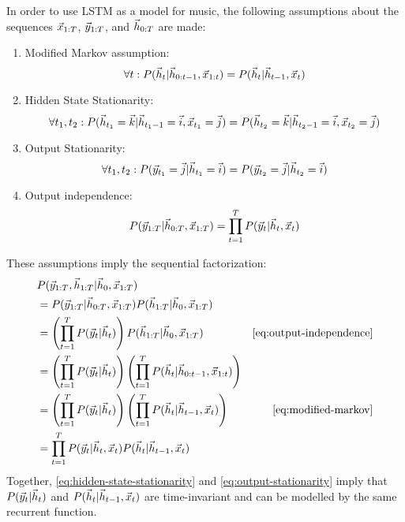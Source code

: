 In order to use LSTM as a model for music, the following assumptions
about the sequences $\vec{x}_{1:T}$, $\vec{y}_{1:T}$, and $\vec{h}_{0:T}$ are made:
\begin{enumerate}
  \item Modified Markov assumption:
    \begin{equation}
      \label{eq:modified-markov}
      \forall t: P(\vec{h}_t | \vec{h}_{0:t-1}, \vec{x}_{1:t}) = P(\vec{h}_t | \vec{h}_{t-1}, \vec{x}_t)
    \end{equation}
  \item Hidden State Stationarity:
    \begin{equation}
      \label{eq:hidden-state-stationarity}
      \forall t_1, t_2: P(\vec{h}_{t_1} = \vec{k} | \vec{h}_{t_{1}-1} = \vec{i}, \vec{x}_{t_1} = \vec{j}) = P(\vec{h}_{t_2} = \vec{k} | \vec{h}_{t_{2}-1} = \vec{i}, \vec{x}_{t_2} = \vec{j})
   \end{equation}
  \item Output Stationarity:
    \begin{equation}
      \label{eq:output-stationarity}
      \forall t_1, t_2: P(\vec{y}_{t_1} = \vec{j} | \vec{h}_{t_1} = \vec{i}) = P(\vec{y}_{t_2} = \vec{j} | \vec{h}_{t_2} = \vec{i})
   \end{equation}
  \item Output independence:
   \begin{equation}
     \label{eq:output-independence}
     P(\vec{y}_{1:T} | \vec{h}_{0:T}, \vec{x}_{1:T}) = \prod_{t=1}^T P(\vec{y}_t | \vec{h}_{t}, \vec{x}_t)
   \end{equation}
\end{enumerate}

These assumptions imply the sequential factorization:
\begin{align}
  &P(\y_{1:T}, \h_{1:T} | \h_0, \x_{1:T})  &\\
  &= P(\y_{1:T} | \h_{0:T}, \x_{1:T}) P(\h_{1:T} | \h_0, \x_{1:T})  &\\
  &= \left( \prod_{t=1}^T P(\y_t | \h_t) \right) P(\h_{1:T}| \h_0, \x_{1:T}) &\text{\cref{eq:output-independence}}\\
  &= \left( \prod_{t=1}^T P(\y_t | \h_t) \right) \left(\prod_{t=1}^T P(\h_{t}| \h_{0:t-1}, \x_{1:t})\right) &\\
  &= \left( \prod_{t=1}^T P(\y_t | \h_t) \right) \left(\prod_{t=1}^T P(\h_{t}| \h_{t-1}, \x_{t})\right) &\text{\cref{eq:modified-markov}}\\
  &= \prod_{t=1}^T P(\y_t | \h_t, \x_t) P(\h_{t}| \h_{t-1}, \x_{t}) & \\
\end{align}
Together, \cref{eq:hidden-state-stationarity} and \cref{eq:output-stationarity} imply that $P(\vec{y}_t | \vec{h}_t)$
and $P(\vec{h}_{t}| \vec{h}_{t-1}, \vec{x}_{t})$ are time-invariant and can be modelled by the same recurrent function.

